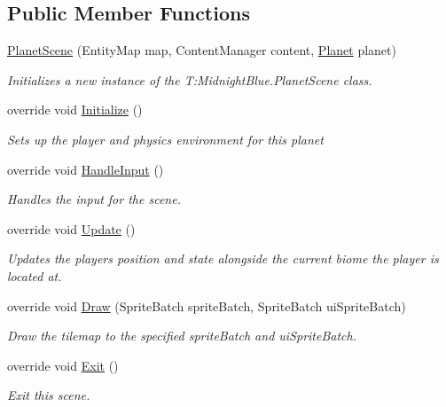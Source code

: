 \subsection*{Public Member Functions}
\begin{DoxyCompactItemize}
\item 
\hyperlink{class_midnight_blue_1_1_planet_scene_a50ee691836116a89ff549e519f895ba3}{Planet\+Scene} (Entity\+Map map, Content\+Manager content, \hyperlink{class_midnight_blue_1_1_planet}{Planet} planet)
\begin{DoxyCompactList}\small\item\em Initializes a new instance of the T\+:\+Midnight\+Blue.\+Planet\+Scene class. \end{DoxyCompactList}\item 
override void \hyperlink{class_midnight_blue_1_1_planet_scene_ac8b7e88283b22b87aa45f116b549e86f}{Initialize} ()
\begin{DoxyCompactList}\small\item\em Sets up the player and physics environment for this planet \end{DoxyCompactList}\item 
override void \hyperlink{class_midnight_blue_1_1_planet_scene_a6c84a639f27b9f7510b514969d47d1bd}{Handle\+Input} ()
\begin{DoxyCompactList}\small\item\em Handles the input for the scene. \end{DoxyCompactList}\item 
override void \hyperlink{class_midnight_blue_1_1_planet_scene_add0a85b4f754f026231aa7269259c65c}{Update} ()
\begin{DoxyCompactList}\small\item\em Updates the players position and state alongside the current biome the player is located at. \end{DoxyCompactList}\item 
override void \hyperlink{class_midnight_blue_1_1_planet_scene_af22a201631e5f8c606ec3f7463635977}{Draw} (Sprite\+Batch sprite\+Batch, Sprite\+Batch ui\+Sprite\+Batch)
\begin{DoxyCompactList}\small\item\em Draw the tilemap to the specified sprite\+Batch and ui\+Sprite\+Batch. \end{DoxyCompactList}\item 
override void \hyperlink{class_midnight_blue_1_1_planet_scene_af3aab90a13294493e1f2cd29b0fb60e6}{Exit} ()
\begin{DoxyCompactList}\small\item\em Exit this scene. \end{DoxyCompactList}\item 

\end{DoxyCompactItemize}
